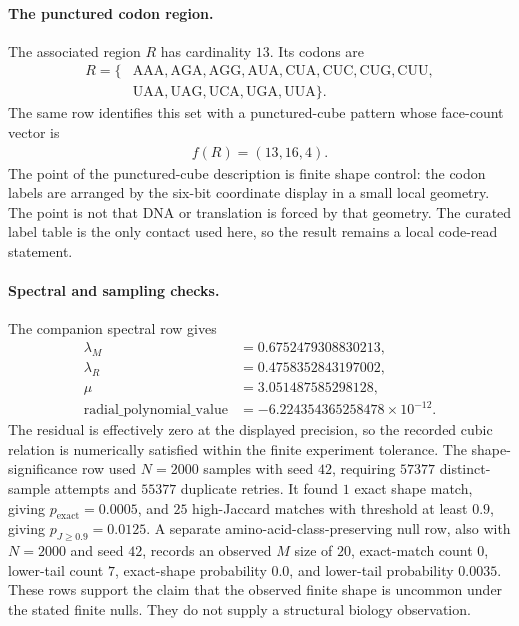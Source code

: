\paragraph{The punctured codon region.}
The associated region $R$ has cardinality $13$.  Its codons are
$$
\begin{aligned}
R=\{&\mathrm{AAA},\mathrm{AGA},\mathrm{AGG},\mathrm{AUA},\mathrm{CUA},\mathrm{CUC},\mathrm{CUG},\mathrm{CUU},\\
&\mathrm{UAA},\mathrm{UAG},\mathrm{UCA},\mathrm{UGA},\mathrm{UUA}\}.
\end{aligned}
$$
The same row identifies this set with a punctured-cube pattern whose face-count vector is
$$
\begin{aligned}
f(R)=(13,16,4).
\end{aligned}
$$
The point of the punctured-cube description is finite shape control: the codon labels are arranged by the six-bit coordinate display in a small local geometry.  The point is not that DNA or translation is forced by that geometry.  The curated label table is the only contact used here, so the result remains a local code-read statement.

\paragraph{Spectral and sampling checks.}
The companion spectral row gives
$$
\begin{aligned}
\lambda_M &= 0.6752479308830213,\\
\lambda_R &= 0.4758352843197002,\\
\mu &= 3.051487585298128,\\
\mathrm{radial\_polynomial\_value} &= -6.224354365258478\times 10^{-12}.
\end{aligned}
$$
The residual is effectively zero at the displayed precision, so the recorded cubic relation is numerically satisfied within the finite experiment tolerance.  The shape-significance row used $N=2000$ samples with seed $42$, requiring $57377$ distinct-sample attempts and $55377$ duplicate retries.  It found $1$ exact shape match, giving $p_{\mathrm{exact}}=0.0005$, and $25$ high-Jaccard matches with threshold at least $0.9$, giving $p_{J\geq 0.9}=0.0125$.  A separate amino-acid-class-preserving null row, also with $N=2000$ and seed $42$, records an observed $M$ size of $20$, exact-match count $0$, lower-tail count $7$, exact-shape probability $0.0$, and lower-tail probability $0.0035$.  These rows support the claim that the observed finite shape is uncommon under the stated finite nulls.  They do not supply a structural biology observation.

